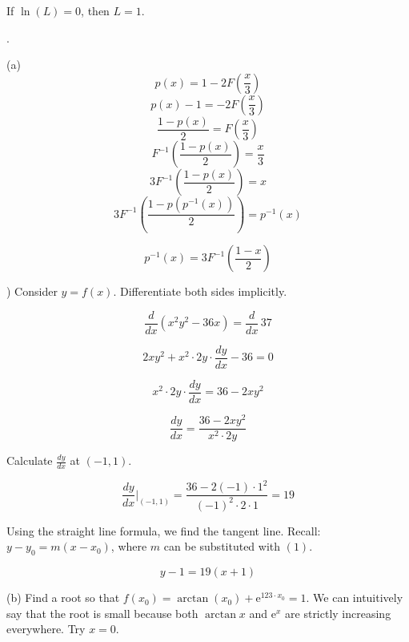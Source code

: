 \documentclass{article}
\begin{document}
\noindent If $\ln(L)=0$, then $\boxed{L=1}$.

\newpage

.

\hfill

\noindent (a) \[p(x)=1-2F\left(\frac x3\right)\]
\[p(x)-1=-2F\left(\frac x3\right)\]
\[\frac{1-p(x)}{2}=F\left(\frac x3\right)\]
\[F^{-1}\left(\frac{1-p(x)}{2}\right)=\frac x3\]
\[3F^{-1}\left(\frac{1-p(x)}{2}\right)=x\]
\[3F^{-1}\left(\frac{1-p\left(p^{-1}(x)\right)}{2}\right)=p^{-1}(x)\]

\[\boxed{p^{-1}(x)=3F^{-1}\left(\frac{1-x}{2}\right)}\]

\hfill

) Consider $y=f(x)$. Differentiate both sides implicitly.

\begin{equation*}\frac{d}{dx}\left(x^2y^2-36x\right) = \frac{d}{dx}\,37\end{equation*}

\begin{equation*}2xy^2+ x^2\cdot2y\cdot \frac{dy}{dx}-36 = 0\end{equation*}

\begin{equation*}x^2\cdot2y\cdot \frac{dy}{dx}=36 - 2xy^2\end{equation*}

\begin{equation*}\frac{dy}{dx}=\frac{36-2xy^2}{x^2\cdot2y}\end{equation*}

\hfill

\noindent Calculate $\displaystyle \frac{dy}{dx}$ at $(-1,1)$.

\hfill

\begin{equation}\frac{dy}{dx}\Bigg|_{(-1,1)}=\frac{36-2(-1)\cdot1^2}{(-1)^2\cdot2\cdot1} = 19\end{equation}

\hfill

\noindent Using the straight line formula, we find the tangent line. Recall: $y-y_0=m(x-x_0)$, where $m$ can be substituted with $(1)$.

\begin{equation*}\boxed{y-1=19(x+1)}\end{equation*}

\hfill

\noindent (b) Find a root so that $f(x_0) = \arctan(x_0)+\mathrm{e}^{123\cdot x_0} = 1$. We can intuitively say that the root is small because both $\arctan x$ and $\mathrm{e}^x$ are strictly increasing everywhere. Try $x=0$.
\end{document}
